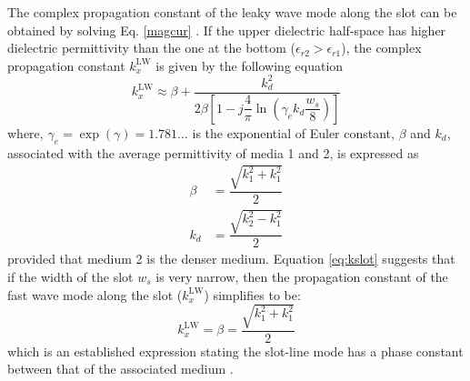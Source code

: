 The complex propagation constant of the leaky wave mode along the slot can be obtained by solving Eq. \ref{magcur} \cite{Neto2005}. If the upper dielectric half-space has higher dielectric permittivity than the one at the bottom ($\epsilon_{r2} > \epsilon_{r1}$), the complex propagation constant $k_x^{\mathrm{LW}}$ is given by the following equation
%
\begin{equation} \label{eq:kslot}
	k_x^{\mathrm{LW}} \approx \beta  + \dfrac{{k_d^2}}{{2\beta \left[ {1 - j\dfrac{4}{\pi }\ln \left( {\gamma_e {k_d}\dfrac{w_s}{8}} \right)} \right]}} 
\end{equation}
%
where, ${\gamma_e=\exp(\gamma)=1.781\ldots}$ is the exponential of Euler constant, $\beta$ and $k_d$, associated with the average permittivity of media 1 and 2, is expressed as 
%
\begin{subequations}
	\begin{align}
		\beta &=   \dfrac{\sqrt{k_1^2+k_1^2}} {2} \\
		k_d & =  \dfrac{\sqrt{k_2^2-k_1^2}} {2} 
	\end{align}
\end{subequations}
%
provided that medium 2 is the denser medium. Equation \ref{eq:kslot} suggests that if the width of the slot $w_s$ is very narrow, then the propagation constant of the fast wave mode along the slot ($k_x^{\mathrm{LW}} $) simplifies to be:
%
\begin{equation} \label{eq: kslotsimple}
	k_x^{\mathrm{LW}} = \beta  =  \dfrac{\sqrt{k_1^2+k_1^2}}{2} 
\end{equation}
%
which is an established expression stating the slot-line mode has a phase constant between that of the associated medium \cite{Galejs1962}.

